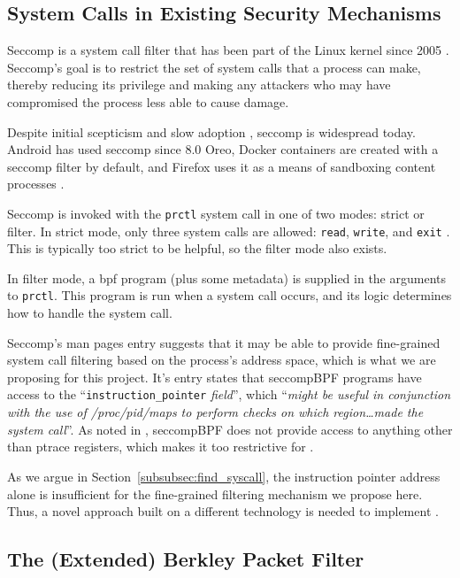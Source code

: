 \subsection{System Calls in Existing Security Mechanisms}

Seccomp is a system call filter that has been part of the Linux kernel since
2005 \cite{arcangeli_seccomp_2005}. Seccomp's goal is to restrict the set of
system calls that a process can make, thereby reducing its privilege and making
any attackers who may have compromised the process less able to cause damage.

Despite initial scepticism and slow adoption
\cite{TORVALDS_ANYONE_USES_SECCOMP}, seccomp is widespread today. Android has
used seccomp since 8.0 Oreo, Docker containers are
created with a seccomp filter by default, and Firefox uses it as a means of
sandboxing content processes \cite{android_seccomp_oreo, docker_seccomp,
firefox_seccomp}.

Seccomp is invoked with the \texttt{prctl} system call in one of two modes: strict
or filter. In strict mode, only three system calls are allowed: \texttt{read},
\texttt{write}, and \texttt{exit} \cite{MAN_PAGES_SECCOMP}. This is typically
too strict to be helpful, so the filter mode also exists.

In filter mode, a \ac{bpf} program (plus some metadata) is supplied in the arguments to
\texttt{prctl}. This program is run when a system call occurs, and its logic
determines how to handle the system call. 

Seccomp's man pages entry suggests that it may be able to provide fine-grained
system call filtering based on the process's address space, which is what we
are proposing for this project. It's entry states that seccompBPF programs have
access to the ``\texttt{instruction\_pointer} \textit{field}'', which
``\textit{might be useful in conjunction with the use of /proc/pid/maps to
perform checks on which region\dots made the system call}''. As noted in
\textcite{yang2024makingsyscallprivilegeright}, seccompBPF does not provide
access to anything other than ptrace registers, which makes it too restrictive
for \af.

As we argue in Section~\ref{subsubsec:find_syscall}, the instruction pointer
address alone is insufficient for the fine-grained filtering mechanism we
propose here. Thus, a novel approach built on a different technology is needed
to implement \af. 

\subsection{The (Extended) Berkley Packet Filter}\label{subsec:bgd-bpf}

